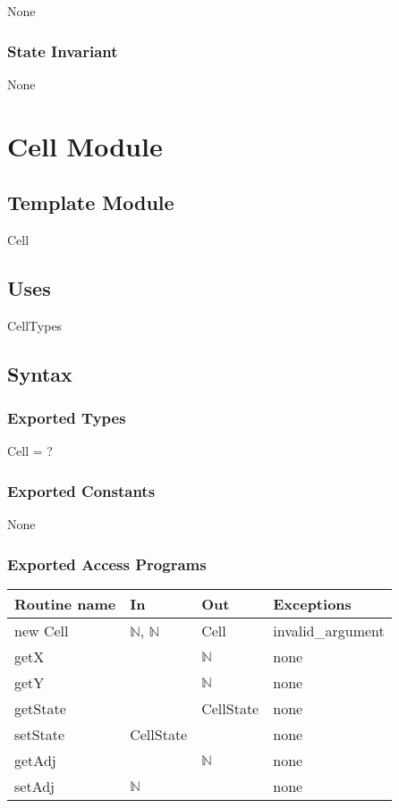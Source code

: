 \documentclass[12pt]{article}
\begin{document}
None

\subsubsection* {State Invariant}

None

\newpage

\section* {Cell Module}

\subsection* {Template Module}

Cell

\subsection* {Uses}

CellTypes

\subsection* {Syntax}

\subsubsection* {Exported Types}

Cell = ?

\subsubsection* {Exported Constants}

None

\subsubsection* {Exported Access Programs}

\begin{tabular}{| l | l | l | p{5cm} |}
\hline
\textbf{Routine name} & \textbf{In} & \textbf{Out} & \textbf{Exceptions}\\
\hline
new Cell & $\mathbb{N}$, $\mathbb{N}$ & Cell & invalid\_argument\\
\hline
getX & & $\mathbb{N}$ & none\\
\hline
getY& & $\mathbb{N}$ & none\\
\hline
getState & & CellState & none\\
\hline
setState & CellState & & none\\
\hline
getAdj & & $\mathbb{N}$ & none\\
\hline
setAdj & $\mathbb{N}$ & & none\\
\hline
\end{tabular}
\end{document}
